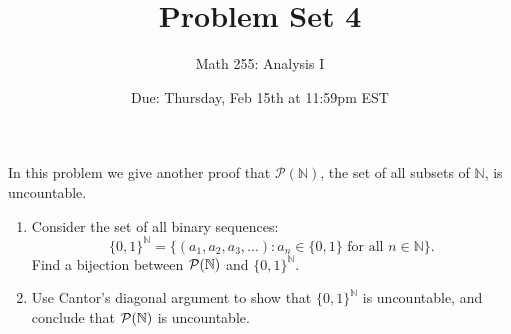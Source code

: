 \documentclass[10pt]{article}
\newcommand{\N}{\mathbb{N}}
\newenvironment{problem}[2][Problem]{\begin{trivlist}
\item[\hskip \labelsep {\bfseries #1}\hskip \labelsep {\bfseries #2.}]}{\end{trivlist}}
\begin{document}
\title{Problem Set 4}
\author{Math 255: Analysis I}
\date{Due: Thursday, Feb 15th at 11:59pm EST}

\maketitle



\begin{problem}{1}
	In this problem we give another proof that $ \mathcal{P}(\N) $, the set of all subsets of $ \N $, is uncountable.
	\begin{enumerate}
		\item Consider the set of all binary sequences:
		\[ \{0,1\}^{\N} = \{ (a_1,a_2,a_3,...) : a_n \in \{0,1\} \text{ for all } n \in \N \}. \]
		Find a bijection between $ \cal{P}(\N) $ and $ \{0,1\}^{\N} $.
		\item Use Cantor's diagonal argument to show that $ \{0,1\}^{\N} $ is uncountable, and conclude that $ \cal{P}(\N) $ is uncountable.
	\end{enumerate}
\end{problem}
\end{document}
